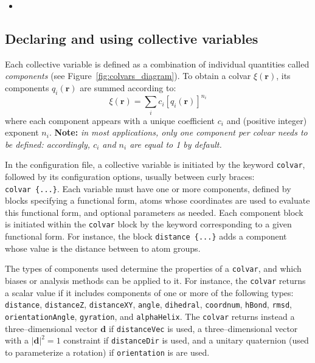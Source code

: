 \begin{itemize}
\item %

\end{itemize}



\subsection{Declaring and using collective variables}
\label{sec:colvar}

Each collective variable is defined as a combination of
individual quantities called \emph{components}
(see Figure~\ref{fig:colvars_diagram}). To obtain a colvar $\xi(\mathbf{r})$,
its components $q_{i}(\mathbf{r})$ are summed according to:
\begin{equation}
  \label{eq:colvar_combination}
  \xi(\mathbf{r}) = \sum_{i} c_{i} [q_{i}(\mathbf{r})]^{n_{i}}
\end{equation}
where each component appears with a unique coefficient $c_{i}$ and
(positive integer) exponent $n_{i}$.  \textbf{Note:} \emph{in most
  applications, only one component per colvar needs to be defined:
  accordingly, $c_{i}$ and $n_{i}$ are equal to 1 by default.}

In the configuration file, a collective variable is initiated
by the keyword \texttt{colvar},
followed by its configuration options, usually between curly braces:
\texttt{colvar~\{...\}}. Each variable must
have one or more components, defined by blocks specifying a
functional form, atoms whose coordinates are used to evaluate
this functional form, and optional parameters as needed. Each
component block is initiated within the \texttt{colvar} block by the
keyword corresponding to a given functional form.  For instance, the
block \texttt{distance \{...\}} adds a component whose value is
the distance between to atom groups.

The types of components used determine the properties of a
\texttt{colvar}, and which biases or analysis methods can be applied
to it.  For instance, the \texttt{colvar} returns a scalar value if it
includes components of one or more of the following types:
\texttt{distance}, \texttt{distanceZ}, \texttt{distanceXY},
\texttt{angle}, \texttt{dihedral}, \texttt{coordnum}, \texttt{hBond},
\texttt{rmsd}, \texttt{orientationAngle}, \texttt{gyration}, and
\texttt{alphaHelix}.  The \texttt{colvar} returns instead a
three--dimensional vector $\mathbf{d}$ if \texttt{distanceVec} is
used, a three--dimensional vector with a $|\mathbf{d}|^{2} = 1$
constraint if \texttt{distanceDir} is used, and a unitary quaternion
(used to parameterize a rotation) if \texttt{orientation} is are used.

